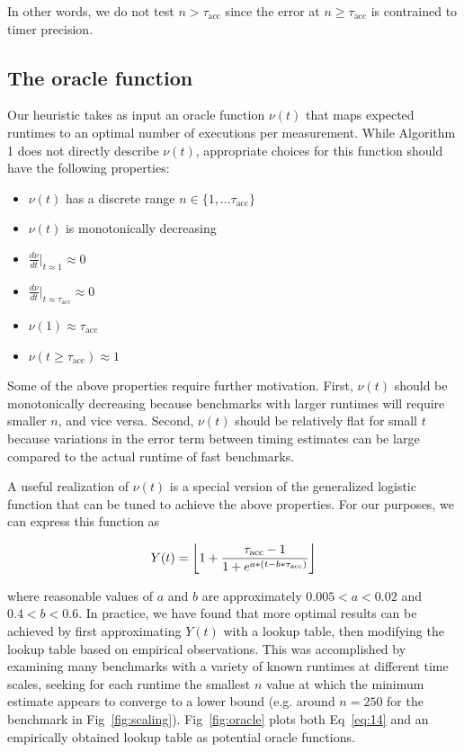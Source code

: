 \documentclass[conference]{IEEEtran}
\DeclarePairedDelimiter\floor{\lfloor}{\rfloor}
\begin{document}
In other words, we do not test $n > \tau_{\textrm{acc}}$ since the error at $n \ge
\tau_{\textrm{acc}}$ is contrained to timer precision.

\subsection{The oracle function}

Our heuristic takes as input an oracle function $\nu(t)$ that maps expected runtimes to an
optimal number of executions per measurement. While Algorithm 1 does not directly describe
$\nu(t)$, appropriate choices for this function should have the following properties:

\begin{itemize}
    \item $\nu(t)$ has a discrete range $n \in \{1, \dots \tau_{\textrm{acc}}\}$
    \item $\nu(t)$ is monotonically decreasing
    \item $\frac{d\nu}{dt}|_{t \approx 1} \approx 0$
    \item $\frac{d\nu}{dt}|_{t \approx \tau_{\textrm{acc}}} \approx 0$
    \item $\nu(1) \approx \tau_{\textrm{acc}}$
    \item $\nu(t \ge \tau_{\textrm{acc}}) \approx 1$
\end{itemize}

Some of the above properties require further motivation. First, $\nu(t)$ should be
monotonically decreasing because benchmarks with larger runtimes will require smaller $n$,
and vice versa. Second, $\nu(t)$ should be relatively flat for small $t$ because variations
in the error term between timing estimates can be large compared to the actual runtime of
fast benchmarks.

A useful realization of $\nu(t)$ is a special version of the generalized logistic function
that can be tuned to achieve the above properties. For our purposes, we can express this
function as

\begin{equation} \label{eq:14}
    Y(t) = \floor*{1 + \frac{\tau_{\textrm{acc}} - 1}{1 + e^{a * (t - b*\tau_{\textrm{acc}})}}}
\end{equation}

where reasonable values of $a$ and $b$ are approximately $0.005 < a < 0.02$ and $0.4 < b <
0.6$. In practice, we have found that more optimal results can be achieved by first
approximating $Y(t)$ with a lookup table, then modifying the lookup table based on empirical
observations. This was accomplished by examining many benchmarks with a variety of known
runtimes at different time scales, seeking for each runtime the smallest $n$ value at which
the minimum estimate appears to converge to a lower bound (e.g. around $n = 250$ for the
benchmark in Fig~\ref{fig:scaling}). Fig~\ref{fig:oracle} plots both Eq~\ref{eq:14} and an
empirically obtained lookup table as potential oracle functions.
\end{document}
